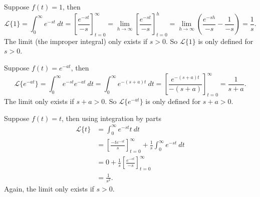 \documentclass[12pt]{book}
\begin{document}
\begin{example}
Suppose $f(t) = 1$, then
\begin{equation*}
\mathcal{L} \{1\} = \int_0^\infty e^{-st} ~ dt
=
\left[ \frac{e^{-st}}{-s} \right]_{t=0}^\infty
=
\lim_{h\to\infty}
\left[ \frac{e^{-st}}{-s} \right]_{t=0}^h
=
\lim_{h\to\infty}
\left( \frac{e^{-sh}}{-s} - \frac{1}{-s} \right)
= \frac{1}{s} .
\end{equation*}
The limit (the improper integral) only exists if $s > 0$.  So 
$\mathcal{L} \{1\}$ is only defined for $s > 0$.
\end{example}

\begin{example}
Suppose $f(t) = e^{-at}$, then
\begin{equation*}
\mathcal{L} \{e^{-at}\}
= \int_0^\infty e^{-st} e^{-at} ~ dt
= \int_0^\infty e^{-(s+a)t} ~ dt
=
\left[ \frac{e^{-(s+a)t}}{-(s+a)} \right]_{t=0}^\infty
= \frac{1}{s+a} .
\end{equation*}
The limit only exists if $s+a > 0$.  So 
$\mathcal{L} \{e^{-at}\}$ is only defined for $s+a > 0$.
\end{example}

\begin{example}
Suppose $f(t) = t$, then using integration by parts
\begin{equation*}
\begin{split}
\mathcal{L} \{t\}
& = \int_0^\infty e^{-st} t ~ dt \\
& =
\left[ \frac{-te^{-st}}{s} \right]_{t=0}^\infty
+
\frac{1}{s}
\int_0^\infty e^{-st} ~dt \\
& =
0
+
\frac{1}{s}
\left[ \frac{e^{-st}}{-s} \right]_{t=0}^\infty \\
& =
\frac{1}{s^2} .
\end{split}
\end{equation*}
Again, the limit only exists if $s > 0$.
\end{example}
\end{document}
